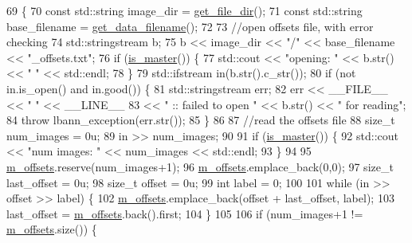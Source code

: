 \begin{DoxyCode}
69                                   \{
70   \textcolor{keyword}{const} std::string image\_dir = \hyperlink{classlbann_1_1generic__data__reader_ab4c6c2d4ba40ece809ce896828c8ff03}{get\_file\_dir}();
71   \textcolor{keyword}{const} std::string base\_filename = \hyperlink{classlbann_1_1generic__data__reader_a56664e1b43f3fe923cf6d652f14b40a9}{get\_data\_filename}();
72 
73   \textcolor{comment}{//open offsets file, with error checking}
74   std::stringstream b;
75   b << image\_dir << \textcolor{stringliteral}{"/"} << base\_filename << \textcolor{stringliteral}{"\_offsets.txt"};
76   \textcolor{keywordflow}{if} (\hyperlink{classlbann_1_1generic__data__reader_ae82c40eebc05e2f0c1198afcc7a7f009}{is\_master}()) \{
77     std::cout << \textcolor{stringliteral}{"opening: "} << b.str() << \textcolor{stringliteral}{" "} << std::endl;
78   \}
79   std::ifstream in(b.str().c\_str());
80   \textcolor{keywordflow}{if} (not in.is\_open() and in.good()) \{
81     std::stringstream err;
82     err << \_\_FILE\_\_ << \textcolor{stringliteral}{" "} << \_\_LINE\_\_
83         << \textcolor{stringliteral}{" ::  failed to open "} << b.str() << \textcolor{stringliteral}{" for reading"};
84     \textcolor{keywordflow}{throw} lbann\_exception(err.str());
85   \}
86 
87   \textcolor{comment}{//read the offsets file}
88   \textcolor{keywordtype}{size\_t} num\_images = 0u;
89   in >> num\_images;
90 
91   \textcolor{keywordflow}{if} (\hyperlink{classlbann_1_1generic__data__reader_ae82c40eebc05e2f0c1198afcc7a7f009}{is\_master}()) \{
92     std::cout << \textcolor{stringliteral}{"num images: "} << num\_images << std::endl;
93   \}
94 
95   \hyperlink{classlbann_1_1imagenet__reader__single_a605ba53f4e3fa02a4fced38d41465a10}{m\_offsets}.reserve(num\_images+1);
96   \hyperlink{classlbann_1_1imagenet__reader__single_a605ba53f4e3fa02a4fced38d41465a10}{m\_offsets}.emplace\_back(0,0);
97   \textcolor{keywordtype}{size\_t} last\_offset = 0u;
98   \textcolor{keywordtype}{size\_t} offset = 0u;
99   \textcolor{keywordtype}{int} label = 0;
100 
101   \textcolor{keywordflow}{while} (in >> offset >> label) \{
102     \hyperlink{classlbann_1_1imagenet__reader__single_a605ba53f4e3fa02a4fced38d41465a10}{m\_offsets}.emplace\_back(offset + last\_offset, label);
103     last\_offset = \hyperlink{classlbann_1_1imagenet__reader__single_a605ba53f4e3fa02a4fced38d41465a10}{m\_offsets}.back().first;
104   \}
105 
106   \textcolor{keywordflow}{if} (num\_images+1 != \hyperlink{classlbann_1_1imagenet__reader__single_a605ba53f4e3fa02a4fced38d41465a10}{m\_offsets}.size()) \{

\end{DoxyCode}

